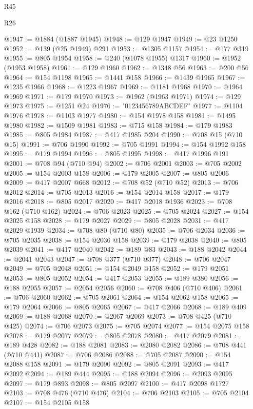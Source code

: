 \begin{lexlean}{R45}
\begin{lexlean}{R26}
\begin{coremodule}
{{{{{{{{{{{{{{{{{{{{{{{{{{{{{{{{{{{{{{{{{{{{{{{{{{{{{{{{{{{{{{{{{{{{{{{{@1947 := @1884 (@1887 @1945)
@1948 := @129 @1947
@1949 := @23 @1250
@1952 := @139 (@25 @1949) @291
@1953 := @1305 @1157
@1954 := @177 @319
@1955 := @805 @1954
@1958 := @240 (@1078 @1955) @1317
@1960 := @1952 (@1953 @1958)
@1961 := @129 @1960
@1962 := @1348 @56
@1963 := @200 @56
@1964 := @154 @1198
@1965 := @1441 @158
@1966 := @1439 @1965
@1967 := @1235 @1966
@1968 := @1223 @1967
@1969 := @1181 @1968
@1970 := @1964 @1969
@1971 := @179 @1970
@1973 := @1962 (@1963 @1971)
@1974 := @129 @1973
@1975 := @1251 @24
@1976 := "0123456789ABCDEF"
@1977 := @1104 @1976
@1978 := @1103 @1977
@1980 := @154 @1978 @158
@1981 := @1495 @1980
@1982 := @1509 @1981
@1983 := @715 @158
@1984 := @179 @1983
@1985 := @805 @1984
@1987 := @417 @1985 @204
@1990 := @708 @15 (@710 @15)
@1991 := @706 @1990
@1992 := @705 @1991
@1994 := @154 @1992 @158
@1995 := @179 @1994
@1996 := @805 @1995
@1998 := @417 @1996 @191
@2001 := @708 @94 (@710 @94)
@2002 := @706 @2001
@2003 := @705 @2002
@2005 := @154 @2003 @158
@2006 := @179 @2005
@2007 := @805 @2006
@2009 := @417 @2007 @668
@2012 := @708 @52 (@710 @52)
@2013 := @706 @2012
@2014 := @705 @2013
@2016 := @154 @2014 @158
@2017 := @179 @2016
@2018 := @805 @2017
@2020 := @417 @2018 @1936
@2023 := @708 @162 (@710 @162)
@2024 := @706 @2023
@2025 := @705 @2024
@2027 := @154 @2025 @158
@2028 := @179 @2027
@2029 := @805 @2028
@2031 := @417 @2029 @1939
@2034 := @708 @80 (@710 @80)
@2035 := @706 @2034
@2036 := @705 @2035
@2038 := @154 @2036 @158
@2039 := @179 @2038
@2040 := @805 @2039
@2041 := @417 @2040
@2042 := @189 @83
@2043 := @188 @2042
@2044 := @2041 @2043
@2047 := @708 @377 (@710 @377)
@2048 := @706 @2047
@2049 := @705 @2048
@2051 := @154 @2049 @158
@2052 := @179 @2051
@2053 := @805 @2052
@2054 := @417 @2053
@2055 := @189 @380
@2056 := @188 @2055
@2057 := @2054 @2056
@2060 := @708 @406 (@710 @406)
@2061 := @706 @2060
@2062 := @705 @2061
@2064 := @154 @2062 @158
@2065 := @179 @2064
@2066 := @805 @2065
@2067 := @417 @2066
@2068 := @189 @409
@2069 := @188 @2068
@2070 := @2067 @2069
@2073 := @708 @425 (@710 @425)
@2074 := @706 @2073
@2075 := @705 @2074
@2077 := @154 @2075 @158
@2078 := @179 @2077
@2079 := @805 @2078
@2080 := @417 @2079
@2081 := @189 @428
@2082 := @188 @2081
@2083 := @2080 @2082
@2086 := @708 @441 (@710 @441)
@2087 := @706 @2086
@2088 := @705 @2087
@2090 := @154 @2088 @158
@2091 := @179 @2090
@2092 := @805 @2091
@2093 := @417 @2092
@2094 := @189 @444
@2095 := @188 @2094
@2096 := @2093 @2095
@2097 := @179 @893
@2098 := @805 @2097
@2100 := @417 @2098 @1727
@2103 := @708 @476 (@710 @476)
@2104 := @706 @2103
@2105 := @705 @2104
@2107 := @154 @2105 @158
}}}}}}}}}}}}}}}}}}}}}}}}}}}}}}}}}}}}}}}}}}}}}}}}}}}}}}}}}}}}}}}}}}}}}}}}
\end{coremodule}
\end{lexlean}
\end{lexlean}
